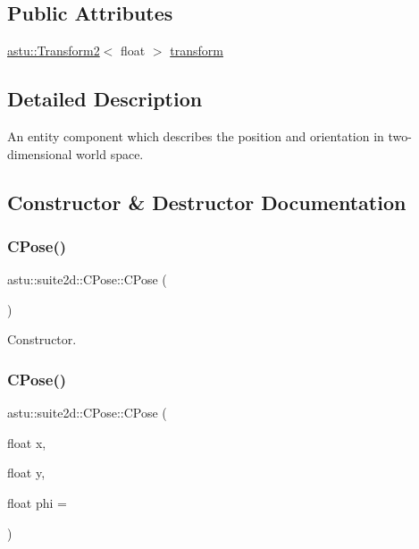 \subsection*{Public Attributes}
\begin{DoxyCompactItemize}
\item 
\hyperlink{classastu_1_1Transform2}{astu\+::\+Transform2}$<$ float $>$ \hyperlink{classastu_1_1suite2d_1_1CPose_af9c1225512bc213fdaff45008416654c}{transform}
\end{DoxyCompactItemize}


\subsection{Detailed Description}
An entity component which describes the position and orientation in two-\/dimensional world space. 

\subsection{Constructor \& Destructor Documentation}
\mbox{\label{classastu_1_1suite2d_1_1CPose_ae43f407c724a21294a886ae9fc0a4d60}} 
\subsubsection{\texorpdfstring{C\+Pose()}{CPose()}\hspace{0.1cm}{\footnotesize\ttfamily [1/2]}}
{\footnotesize\ttfamily astu\+::suite2d\+::\+C\+Pose\+::\+C\+Pose (\begin{DoxyParamCaption}{ }\end{DoxyParamCaption})\hspace{0.3cm}{\ttfamily [inline]}}

Constructor. \mbox{\label{classastu_1_1suite2d_1_1CPose_a84da6beb4c3f58a90eee567a649cabf4}} 
\subsubsection{\texorpdfstring{C\+Pose()}{CPose()}\hspace{0.1cm}{\footnotesize\ttfamily [2/2]}}
{\footnotesize\ttfamily astu\+::suite2d\+::\+C\+Pose\+::\+C\+Pose (\begin{DoxyParamCaption}\item[{float}]{x,  }\item[{float}]{y,  }\item[{float}]{phi = {} }\end{DoxyParamCaption})\hspace{0.3cm}{\ttfamily [inline]}}

